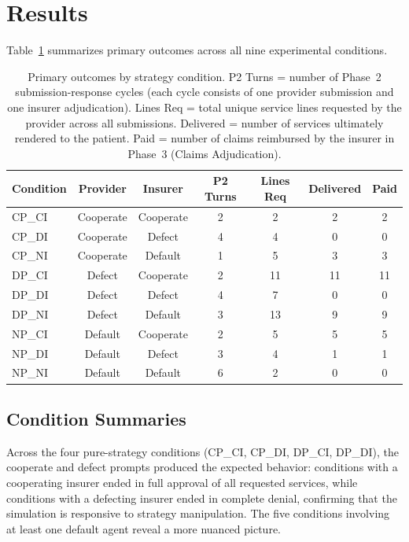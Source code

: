\section{Results}
\label{sec:results}

Table~\ref{tab:outcomes} summarizes primary outcomes across all nine experimental conditions.

\begin{table}[t]
\centering
\caption{Primary outcomes by strategy condition. P2 Turns = number of Phase~2 submission-response cycles (each cycle consists of one provider submission and one insurer adjudication). Lines Req = total unique service lines requested by the provider across all submissions. Delivered = number of services ultimately rendered to the patient. Paid = number of claims reimbursed by the insurer in Phase~3 (Claims Adjudication).}
\label{tab:outcomes}
\begin{tabular}{lcccccc}
\toprule
Condition & Provider & Insurer & P2 Turns & Lines Req & Delivered & Paid \\
\midrule
CP\_CI & Cooperate & Cooperate & 2 & 2 & 2 & 2 \\
CP\_DI & Cooperate & Defect   & 4 & 4 & 0 & 0 \\
CP\_NI & Cooperate & Default  & 1 & 5 & 3 & 3 \\
DP\_CI & Defect    & Cooperate & 2 & 11 & 11 & 11 \\
DP\_DI & Defect    & Defect   & 4 & 7 & 0 & 0 \\
DP\_NI & Defect    & Default  & 3 & 13 & 9 & 9 \\
NP\_CI & Default   & Cooperate & 2 & 5 & 5 & 5 \\
NP\_DI & Default   & Defect   & 3 & 4 & 1 & 1 \\
NP\_NI & Default   & Default  & 6 & 2 & 0 & 0 \\
\bottomrule
\end{tabular}
\end{table}

\subsection{Condition Summaries}
\label{sec:condition-summaries}

Across the four pure-strategy conditions (CP\_CI, CP\_DI, DP\_CI, DP\_DI), the cooperate and defect prompts produced the expected behavior: conditions with a cooperating insurer ended in full approval of all requested services, while conditions with a defecting insurer ended in complete denial, confirming that the simulation is responsive to strategy manipulation. The five conditions involving at least one default agent reveal a more nuanced picture.

